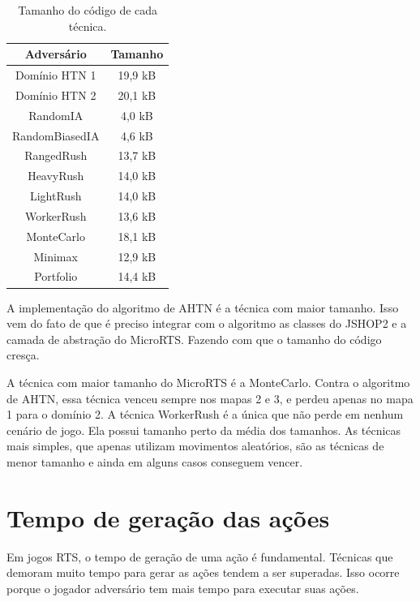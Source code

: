 \begin{table}[ht]
	\centering
	\caption{Tamanho do código de cada técnica.}
	\label{tab:tamanho}
	\begin{tabular}{|c|c|}
		\hline
		\textbf{Adversário}     & \textbf{Tamanho} \\ \hline
		Domínio HTN 1           & 19,9 kB          \\ \hline
		Domínio HTN 2           & 20,1 kB          \\ \hline
		RandomIA                & 4,0 kB           \\ \hline
		RandomBiasedIA          & 4,6 kB           \\ \hline
		RangedRush              & 13,7 kB          \\ \hline
		HeavyRush               & 14,0 kB          \\ \hline
		LightRush               & 14,0 kB          \\ \hline
		WorkerRush              & 13,6 kB          \\ \hline
		MonteCarlo              & 18,1 kB          \\ \hline
		Minimax                 & 12,9 kB          \\ \hline
		Portfolio               & 14,4 kB          \\ \hline
	\end{tabular}
\end{table}

A implementação do algoritmo de AHTN é a técnica com maior tamanho.
Isso vem do fato de que é preciso integrar com o algoritmo as classes do JSHOP2 e a camada de abstração do MicroRTS.
Fazendo com que o tamanho do código cresça.

A técnica com maior tamanho do MicroRTS é a MonteCarlo.
Contra o algoritmo de AHTN, essa técnica venceu sempre nos mapas 2 e 3, e perdeu apenas no mapa 1 para o domínio 2.
A técnica WorkerRush é a única que não perde em nenhum cenário de jogo.
Ela possui tamanho perto da média dos tamanhos.
As técnicas mais simples, que apenas utilizam movimentos aleatórios, são as técnicas de menor tamanho e ainda em alguns casos conseguem vencer.

\section{Tempo de geração das ações}

Em jogos RTS, o tempo de geração de uma ação é fundamental.
Técnicas que demoram muito tempo para gerar as ações tendem a ser superadas.
Isso ocorre porque o jogador adversário tem mais tempo para executar suas ações.

